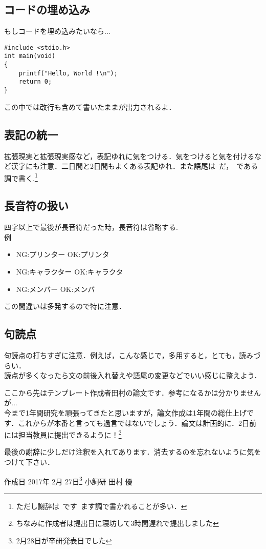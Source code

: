 \subsection{コードの埋め込み}
もしコードを埋め込みたいなら...

\begin{lstlisting}
#include <stdio.h>
int main(void)
{
	printf("Hello, World !\n");
	return 0;
}
\end{lstlisting}
この中では改行も含めて書いたままが出力されるよ．

\subsection{表記の統一}
拡張現実と拡張現実感など，表記ゆれに気をつける．気をつけると気を付けるなど漢字にも注意．二日間と2日間もよくある表記ゆれ．また語尾は~だ，~である調で書く.\footnote{ただし謝辞は~です~ます調で書かれることが多い．}

\subsection{長音符の扱い}
四字以上で最後が長音符だった時，長音符は省略する.\\例
\begin{itemize}
 \item NG:プリンター OK:プリンタ
 \item NG:キャラクター OK:キャラクタ
 \item NG:メンバー OK:メンバ
\end{itemize}
この間違いは多発するので特に注意．

\subsection{句読点}
句読点の打ちすぎに注意．例えば，こんな感じで，多用すると，とても，読みづらい．\\
読点が多くなったら文の前後入れ替えや語尾の変更などでいい感じに整えよう．

\newpage
ここから先はテンプレート作成者田村の論文です．参考になるかは分かりませんが...\\
今まで1年間研究を頑張ってきたと思いますが，論文作成は1年間の総仕上げです．これからが本番と言っても過言ではないでしょう．論文は計画的に．2日前には担当教員に提出できるように！\footnote{ちなみに作成者は提出日に寝坊して3時間遅れで提出しました}

最後の謝辞に少しだけ注釈を入れてあります．消去するのを忘れないように気をつけて下さい．

作成日 2017年 2月 27日\footnote{2月28日が卒研発表日でした} 小飼研 田村 優